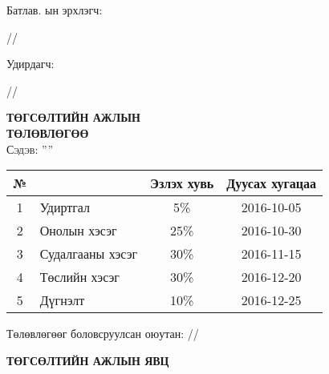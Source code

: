 
\begin{titlepage}

\vspace*{0.5cm}
Батлав. \deptname ын эрхлэгч: 
\begin{flushright}
\makebox[4cm]{\dotfill} /\chairname/ 
\end{flushright}

Удирдагч: 
\begin{flushright}
\makebox[4cm]{\dotfill} /\supname/
\end{flushright}

\begin{center}

\vspace*{2cm}
\textbf{{\large ТӨГСӨЛТИЙН АЖЛЫН \\ ТӨЛӨВЛӨГӨӨ}}\\[0.5cm]

\textsc{\large Сэдэв: ''\ttitle''}\\[0.5cm]

\begin{tabular}{|c|p{7cm}|c|c|}
	\hline
	№ & \makebox[7cm][c]{Ажлын бүлэг, хэсгийн нэр} & Эзлэх хувь & Дуусах хугацаа \\ \hline
	1 & {Удиртгал}         &  5\% & 2016-10-05 \\ \hline
	2 & {Онолын хэсэг}     & 25\% & 2016-10-30 \\ \hline
	3 & {Судалгааны хэсэг} & 30\% & 2016-11-15 \\ \hline
	4 & {Төслийн хэсэг}    & 30\% & 2016-12-20 \\ \hline
	5 & {Дүгнэлт}          & 10\% & 2016-12-25 \\ \hline
\end{tabular}

\vspace{2cm}
Төлөвлөгөөг боловсруулсан оюутан: \makebox[3cm]{\dotfill} /\shortname/

\end{center}

\newpage

\begin{center}

\vspace*{2cm}
\textbf{{\large ТӨГСӨЛТИЙН АЖЛЫН ЯВЦ}}\\[0.5cm]


\end{center}
\end{titlepage}

